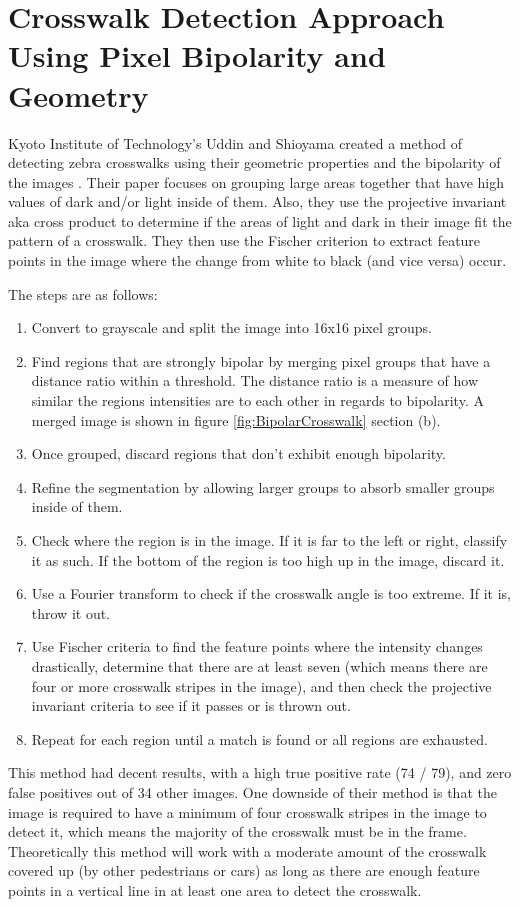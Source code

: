 \documentclass[12pt]{ucthesis}
\begin{document}

\section{Crosswalk Detection Approach Using Pixel Bipolarity and Geometry}

Kyoto Institute of Technology's Uddin and Shioyama created a method of detecting zebra crosswalks using their geometric properties and the bipolarity of the images \cite{relatedworkbipolarity}. Their paper focuses on grouping large areas together that have high values of dark and/or light inside of them. Also, they use the projective invariant aka cross product to determine if the areas of light and dark in their image fit the pattern of a crosswalk. They then use the Fischer criterion to extract feature points in the image where the change from white to black (and vice versa) occur.

The steps are as follows:
\begin{enumerate}
   \item Convert to grayscale and split the image into 16x16 pixel groups.
   \item Find regions that are strongly bipolar by merging pixel groups that have a distance ratio within a threshold. The distance ratio is a measure of how similar the regions intensities are to each other in regards to bipolarity. A merged image is shown in figure \ref{fig:BipolarCrosswalk} section  (b).
   \item Once grouped, discard regions that don't exhibit enough bipolarity.
   \item Refine the segmentation by allowing larger groups to absorb smaller groups inside of them.
   \item Check where the region is in the image. If it is far to the left or right, classify it as such. If the bottom of the region is too high up in the image, discard it.
   \item Use a Fourier transform to check if the crosswalk angle is too extreme. If it is, throw it out. 
   \item Use Fischer criteria to find the feature points where the intensity changes drastically, determine that there are at least seven (which means there are four or more crosswalk stripes in the image), and then check the projective invariant criteria to see if it passes or is thrown out. 
   \item Repeat for each region until a match is found or all regions are exhausted.
\end{enumerate}
This method had decent results, with a high true positive rate (74 / 79), and zero false positives out of 34 other images. One downside of their method is that the image is required to have a minimum of four crosswalk stripes in the image to detect it, which means the majority of the crosswalk must be in the frame. Theoretically this method will work with a moderate amount of the crosswalk covered up (by other pedestrians or cars) as long as there are enough feature points in a vertical line in at least one area to detect the crosswalk. 
\end{document}
